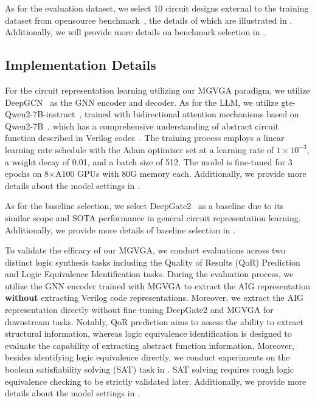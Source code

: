 As for the evaluation dataset, we select 10 circuit designs external to the training dataset from opensource benchmark~\citep{chowdhury2021openabcd,EPFLBenchmarks2015,openrisc2009or1200,yosys2019picorv32,asanovic2016rocket}, the details of which are illustrated in .
Additionally, we will provide more details on benchmark selection in .

\subsection{Implementation Details}
\label{sec:imple_detail}

For the circuit representation learning utilizing our MGVGA paradigm, we utilize DeepGCN~\citep{li2019deepgcn,li2020deepergcn} as the GNN encoder and decoder.
As for the LLM, we utilize gte-Qwen2-7B-instruct~\citep{li2023gte}, trained with bidirectional attention mechanisms based on Qwen2-7B~\citep{yang2024qwen2}, which has a comprehensive understanding of abstract circuit function described in Verilog codes~\citep{liu2023rtlcoder, pei2024betterv, tsai2024rtlfixer, fang2024assertllm}.
The training process employs a linear learning rate schedule with the Adam optimizer set at a learning rate of $1 \times 10^{-3}$, a weight decay of 0.01, and a batch size of 512.
The model is fine-tuned for 3 epochs on 8$\times$A100 GPUs with 80G memory each.
Additionally, we provide more details about the model settings in .

As for the baseline selection, we select DeepGate2~\citep{shi2023deepgate2} as a baseline due to its similar scope and SOTA performance in general circuit representation learning.
Additionally, we provide more details of baseline selection in .

To validate the efficacy of our MGVGA, we conduct evaluations across two distinct logic synthesis tasks including the Quality of Results (QoR) Prediction and Logic Equivalence Identification tasks.
During the evaluation process, we utilize the GNN encoder trained with MGVGA to extract the AIG representation \textbf{without} extracting Verilog code representations.
Moreover, we extract the AIG representation directly without fine-tuning DeepGate2 and MGVGA for downstream tasks.
Notably, QoR prediction aims to assess the ability to extract structural information, whereas logic equivalence identification is designed to evaluate the capability of extracting abstract function information.
Moreover, besides identifying logic equivalence directly, we conduct experiments on the boolean satisfiability solving (SAT) task in .
SAT solving requires rough logic equivalence checking to be strictly validated later.
Additionally, we provide more details about the model settings in .

